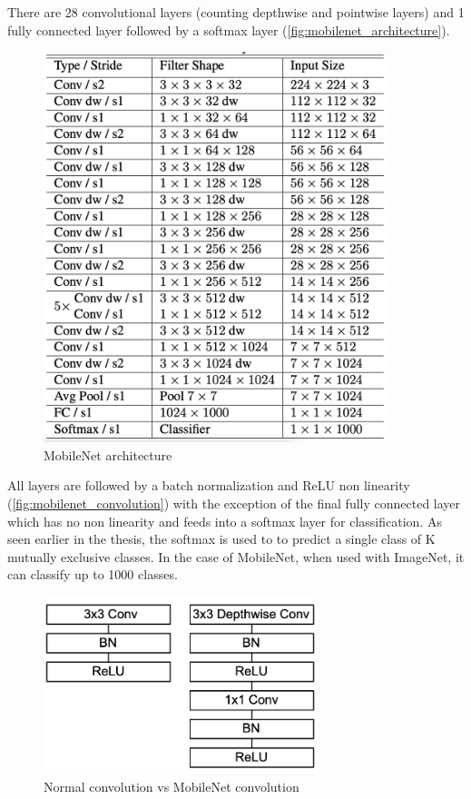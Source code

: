 There are 28 convolutional layers (counting depthwise and pointwise layers) and
1 fully connected layer followed by a softmax layer
(\autoref{fig:mobilenet_architecture}).

\begin{figure}[ht]
    \includegraphics[width=10cm]{images/results/mobilenet_architecture.png}
    \centering
    \caption{MobileNet architecture}\label{fig:mobilenet_architecture}
\end{figure}

All layers are followed by a batch normalization and ReLU non linearity
(\autoref{fig:mobilenet_convolution}) with the exception of the final fully
connected layer which has no non linearity and feeds into a softmax layer for
classification.
As seen earlier in the thesis, the softmax is used to to predict a single class
of K mutually exclusive classes. In the case of MobileNet, when used with
ImageNet, it can classify up to 1000 classes.

\begin{figure}[ht]
    \includegraphics[width=8cm]{images/results/mobilenet_convolution.png}
    \centering
    \caption{Normal convolution vs MobileNet convolution}\label{fig:mobilenet_convolution}
\end{figure}

